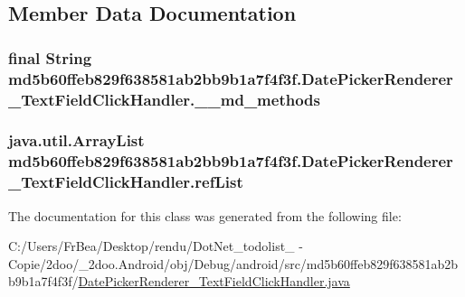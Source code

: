 \subsection{Member Data Documentation}
\hypertarget{classmd5b60ffeb829f638581ab2bb9b1a7f4f3f_1_1_date_picker_renderer___text_field_click_handler_8220432a20203dce9a5e72418b7e64a1}{
\subsubsection[{\_\-\_\-md\_\-methods}]{\setlength{\rightskip}{0pt plus 5cm}final String {\bf md5b60ffeb829f638581ab2bb9b1a7f4f3f.DatePickerRenderer\_\-TextFieldClickHandler.\_\-\_\-md\_\-methods}}}
\label{classmd5b60ffeb829f638581ab2bb9b1a7f4f3f_1_1_date_picker_renderer___text_field_click_handler_8220432a20203dce9a5e72418b7e64a1}


\hypertarget{classmd5b60ffeb829f638581ab2bb9b1a7f4f3f_1_1_date_picker_renderer___text_field_click_handler_ff62dcfd49601b9c6b710036d9b041f1}{
\subsubsection[{refList}]{\setlength{\rightskip}{0pt plus 5cm}java.util.ArrayList {\bf md5b60ffeb829f638581ab2bb9b1a7f4f3f.DatePickerRenderer\_\-TextFieldClickHandler.refList}}}
\label{classmd5b60ffeb829f638581ab2bb9b1a7f4f3f_1_1_date_picker_renderer___text_field_click_handler_ff62dcfd49601b9c6b710036d9b041f1}




The documentation for this class was generated from the following file:\begin{CompactItemize}
\item 
C:/Users/FrBea/Desktop/rendu/DotNet\_\-todolist\_ - Copie/2doo/\_\-2doo.Android/obj/Debug/android/src/md5b60ffeb829f638581ab2bb9b1a7f4f3f/\hyperlink{_date_picker_renderer___text_field_click_handler_8java}{DatePickerRenderer\_\-TextFieldClickHandler.java}\end{CompactItemize}
